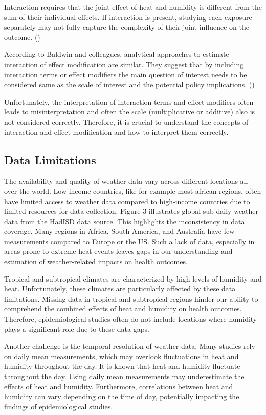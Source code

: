 \documentclass[
]{krantz}
\begin{document}
Interaction requires that the joint effect of heat and humidity is different from the sum of their individual effects. If interaction is present, studying each exposure separately may not fully capture the complexity of their joint influence on the outcome. (\citet{vanderweele})

According to Baldwin and colleagues, analytical approaches to estimate interaction of effect modification are similar. They suggest that by including interaction terms or effect modifiers the main question of interest needs to be considered same as the scale of interest and the potential policy implications. (\citet{bald})

Unfortunately, the interpretation of interaction terms and effect modifiers often leads to misinterpretation and often the scale (multiplicative or additive) also is not considered correctly. Therefore, it is crucial to understand the concepts of interaction and effect modification and how to interpret them correctly.

\subsection{Data Limitations}\label{data-limitations}

The availability and quality of weather data vary across different locations all over the world. Low-income countries, like for example most african regions, often have limited access to weather data compared to high-income countries due to limited resources for data collection. Figure 3 illustrates global sub-daily weather data from the HadISD data source. This highlights the inconsistency in data coverage. Many regions in Africa, South America, and Australia have few measurements compared to Europe or the US. Such a lack of data, especially in areas prone to extreme heat events leaves gaps in our understanding and estimation of weather-related impacts on health outcomes.

Tropical and subtropical climates are characterized by high levels of humidity and heat. Unfortunately, these climates are particularly affected by these data limitations. Missing data in tropical and subtropical regions hinder our ability to comprehend the combined effects of heat and humidity on health outcomes. Therefore, epidemiological studies often do not include locations where humidity plays a significant role due to these data gaps.

Another challenge is the temporal resolution of weather data. Many studies rely on daily mean measurements, which may overlook fluctuations in heat and humidity throughout the day. It is known that heat and humidity fluctuate throughout the day. Using daily mean measurements may underestimate the effects of heat and humidity. Furthermore, correlations between heat and humidity can vary depending on the time of day, potentially impacting the findings of epidemiological studies.
\end{document}
